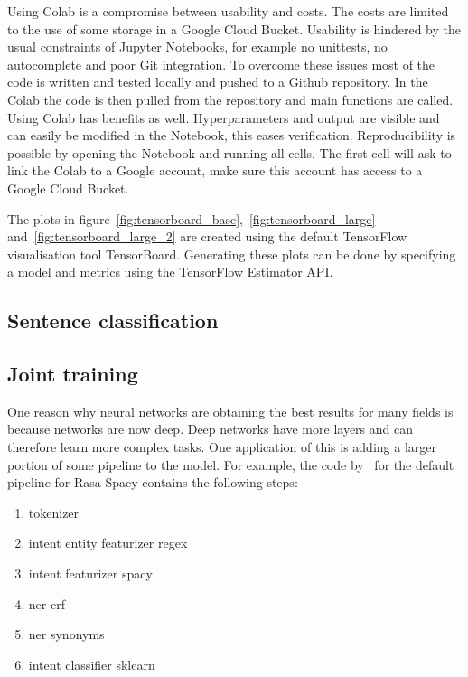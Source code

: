 Using Colab is a compromise between usability and costs.
The costs are limited to the use of some storage in a Google Cloud Bucket.
Usability is hindered by the usual constraints of Jupyter Notebooks, for example no unittests, no autocomplete and poor Git integration.
To overcome these issues most of the code is written and tested locally and pushed to a Github repository.
In the Colab the code is then pulled from the repository and main functions are called.
Using Colab has benefits as well.
Hyperparameters and output are visible and can easily be modified in the Notebook, this eases verification.
Reproducibility is possible by opening the Notebook and running all cells.
The first cell will ask to link the Colab to a Google account, make sure this account has access to a Google Cloud Bucket.

The plots in figure~\ref{fig:tensorboard_base},~\ref{fig:tensorboard_large} and~\ref{fig:tensorboard_large_2} are created using the default TensorFlow visualisation tool TensorBoard.
Generating these plots can be done by specifying a model and metrics using the TensorFlow Estimator API.



\subsection{Sentence classification}
\label{subsec:sentence_classification}


\subsection{Joint training}
\label{subsec:joint_training}

One reason why neural networks are obtaining the best results for many fields is because networks are now deep.
Deep networks have more layers and can therefore learn more complex tasks.
One application of this is adding a larger portion of some pipeline to the model.
For example, the code by~\citet{rasa2018} for the default pipeline for Rasa Spacy contains the following steps:
\begin{enumerate}
    \item tokenizer
    \item intent entity featurizer regex
    \item intent featurizer spacy
    \item ner crf
    \item ner synonyms
    \item intent classifier sklearn
\end{enumerate}

